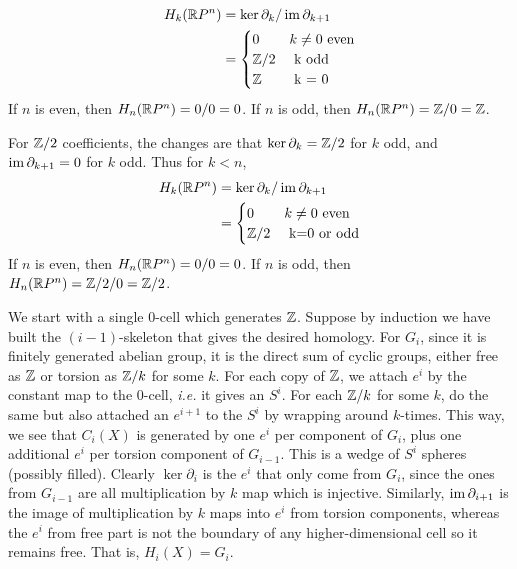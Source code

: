 \documentclass[12pt]{article}
\begin{document}
\begin{problem}[7]
\begin{align*}
	H_k(\rr P^{n}) &= \ker \partial_k / \im \partial_{k+1}\\
		       &=\begin{cases}
			       0 & k \neq 0 \text{ even}\\
			       \zz /2 & $ k$  \text{ odd} \\
			       \zz & $ k = 0$
	\end{cases}
\end{align*}
If $ n$ is even, then  $ H_n(\mathbb{R} P^{n}) = 0 / 0 =0$. If $ n$ is odd, then  $ H_n(\mathbb{R} P^{n}) = \mathbb{Z} / 0 = \mathbb{Z}$.

For $ \mathbb{Z} /2$ coefficients, the changes are that $ \ker \partial_k = \mathbb{Z} /2$ for $ k$ odd, and  $ \operatorname{im} \partial_{k+1} = 0$ for $ k$ odd. Thus for $ k<n$,
\begin{align*}
	H_k(\rr P^{n}) &= \ker \partial_k / \im \partial_{k+1}\\
		       &=\begin{cases}
			       0 & k \neq 0 \text{ even}\\
			       \zz /2 & $ k=0$  \text{ or odd} \\
	\end{cases}
\end{align*}
If $ n$ is even, then  $ H_n(\mathbb{R} P^{n}) = 0 / 0 =0$. If $ n$ is odd, then  $ H_n(\mathbb{R} P^{n}) = \mathbb{Z} /2 / 0 = \mathbb{Z} /2$.


\end{problem}

\begin{problem}[8]
We start with a single 0-cell which generates $ \mathbb{Z}$. Suppose by induction we have built the $ (i-1)$-skeleton that gives the desired homology. For $ G_i$, since it is finitely generated abelian group, it is the direct sum of cyclic groups, either free as $ \mathbb{Z}$ or torsion as $ \mathbb{Z} /k$ for some $ k$. For each copy of $ \mathbb{Z}$, we attach $ e^{i}$ by the constant map to the 0-cell, \emph{i.e.} it gives an $ S^{i}$. For each $ \mathbb{Z} /k$ for some $ k$, do the same but also attached an $ e^{i+1}$ to the $ S^{i}$ by wrapping around $ k$-times. This way, we see that  $ C_i(X)$ is generated by one $ e^{i}$ per component of $ G_i$, plus one additional $ e^{i}$ per torsion component of $ G_{i-1}$. This is a wedge of $ S^{i}$ spheres (possibly filled). Clearly $ \ker \partial_i$ is the $ e^{i}$ that only come from $ G_i$, since the ones from $ G_{i-1}$ are all multiplication by $ k$ map which is injective. Similarly,  $ \operatorname{im} \partial_{i+1}$ is the image of multiplication by $ k$ maps into  $ e^{i}$ from torsion components, whereas the $ e^{i}$ from free part is not the boundary of any higher-dimensional cell so it remains free. That is, $ H_i(X) = G_i$.
\end{problem}
\end{document}
